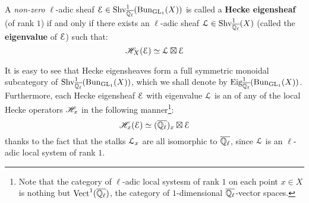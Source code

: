         \begin{definition} \label{def: hecke_eigensheaves}
            A \textit{non-zero} $\ell$-adic sheaf $\mathcal{E} \in \mathrm{Shv}_{\overline{\mathbb{Q}_{\ell}}}^1(\mathrm{Bun}_{\operatorname{GL}_1}(X))$ is called a \textbf{Hecke eigensheaf} (of rank $1$) if and only if there exists an $\ell$-adic sheaf $\mathcal{L} \in \mathrm{Shv}_{\overline{\mathbb{Q}_{\ell}}}^1(X)$ (called the \textbf{eigenvalue} of $\mathcal{E}$) such that:
                $$\mathscr{H}_X(\mathcal{E}) \simeq \mathcal{L} \boxtimes \mathcal{E}$$
        \end{definition}
        \begin{remark}
            It is easy to see that Hecke eigensheaves form a full symmetric monoidal subcategory of $\mathrm{Shv}_{\overline{\mathbb{Q}_{\ell}}}^1(\mathrm{Bun}_{\operatorname{GL}_1}(X))$, which we shall denote by $\mathrm{Eig}^1_{\overline{\mathbb{Q}_{\ell}}}(\mathrm{Bun}_{\operatorname{GL}_1}(X))$. Furthermore, each Hecke eigensheaf $\mathcal{E}$ with eigenvalue $\mathcal{L}$ is an  of any of the local Hecke operators $\mathscr{H}_x$ in the following manner\footnote{Note that the category of $\ell$-adic local systesm of rank $1$ on each point $x \in X$ is nothing but $\mathrm{Vect}^1(\overline{\mathbb{Q}_{\ell}})$, the category of $1$-dimensional $\overline{\mathbb{Q}_{\ell}}$-vector spaces.}:
                $$\mathscr{H}_x(\mathcal{E}) \simeq (\overline{\mathbb{Q}_{\ell}})_x \boxtimes \mathcal{E}$$
            thanks to the fact that the stalks $\mathcal{L}_x$ are all isomorphic to $\overline{\mathbb{Q}_{\ell}}$, since $\mathcal{L}$ is an $\ell$-adic local system of rank $1$.
        \end{remark}
    
